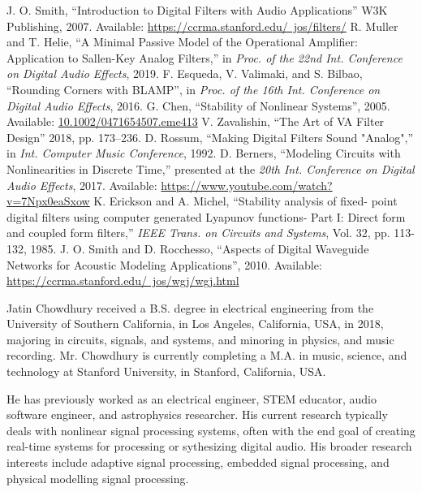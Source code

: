 \documentclass{IEEEtran}
\begin{document}
\begin{thebibliography}{00}
 J. O. Smith, ``Introduction to Digital Filters with Audio Applications'' W3K Publishing, 2007.  Available: \underline {https://ccrma.stanford.edu/~jos/filters/}
 R. Muller and T. Helie, ``A Minimal Passive Model of the Operational Amplifier: Application to  Sallen-Key Analog Filters,'' in \emph{Proc. of the 22nd Int. Conference on Digital Audio Effects}, 2019.
 F. Esqueda, V. Valimaki, and S. Bilbao, ``Rounding Corners with BLAMP'', in \emph{Proc. of the 16th Int. Conference on Digital Audio Effects}, 2016.
 G. Chen, ``Stability of Nonlinear Systems'', 2005. Available: \underline{10.1002/0471654507.eme413}
 V. Zavalishin, ``The Art of VA Filter Design'' 2018, pp. 173--236.%
 D. Rossum, ``Making Digital Filters Sound "Analog",'' in \emph{Int. Computer Music Conference}, 1992.
 D. Berners, ``Modeling Circuits with Nonlinearities in Discrete Time,'' presented at the \emph{20th Int. Conference on Digital Audio Effects}, 2017. Available: \underline{https://www.youtube.com/watch?v=7Npx0eaSxow}
 K. Erickson and A. Michel, ``Stability analysis of fixed- point digital filters using computer generated Lyapunov functions- Part I: Direct form and coupled form filters,'' \emph{IEEE Trans. on Circuits and Systems}, Vol. 32, pp. 113-132, 1985.
 J. O. Smith and D. Rocchesso, ``Aspects of Digital Waveguide Networks for Acoustic Modeling Applications'', 2010. Available: \underline{https://ccrma.stanford.edu/~jos/wgj/wgj.html}
\end{thebibliography}

\begin{IEEEbiographynophoto}{Jatin Chowdhury} received a B.S. degree in
electrical engineering from the University of Southern California, in Los
Angeles, California, USA, in 2018,
majoring in circuits, signals, and systems, and minoring in physics, and
music recording. Mr. Chowdhury is currently completing a M.A. in
music, science, and technology at Stanford University, in Stanford,
California, USA.

He has previously worked as an electrical engineer, STEM educator,
audio software engineer, and astrophysics researcher. His current
research typically deals with nonlinear signal processing systems,
often with the end goal of creating real-time systems for processing
or sythesizing digital audio. His broader research interests include
adaptive signal processing, embedded signal processing, and physical
modelling signal processing.
\end{IEEEbiographynophoto}
\end{document}
